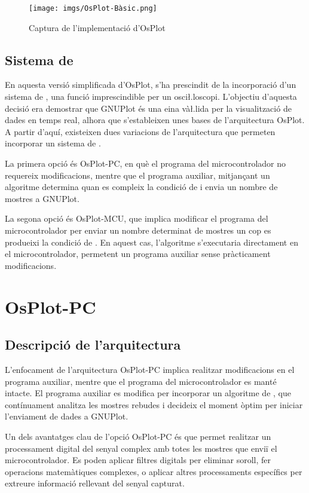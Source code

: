 \documentclass{tfgitic}[2023/07/07]
\begin{document}
\begin{figure}[h]
  \centering \texttt{[image: imgs/OsPlot-Bàsic.png]}
  \caption{Captura de l'implementació d'OsPlot}
\end{figure}

\subsection{Sistema de }

En aquesta versió simplificada d'OsPlot, s'ha prescindit de la
incorporació d'un sistema de , una funció imprescindible
per un osci\l.loscopi. L'objectiu d'aquesta decisió era demostrar que
GNUPlot és una eina và\l.lida per la visualització de dades en temps
real, alhora que s'estableixen unes bases de l'arquitectura OsPlot. A
partir d'aquí, existeixen dues variacions de l'arquitectura que
permeten incorporar un sistema de .

La primera opció és OsPlot-PC, en què el programa del microcontrolador
no requereix modificacions, mentre que el programa auxiliar,
mitjançant un algoritme determina quan es compleix la condició de
 i envia un nombre de mostres a GNUPlot.

La segona opció és OsPlot-MCU, que implica modificar el programa del
microcontrolador per enviar un nombre determinat de mostres un cop es
produeixi la condició de . En aquest cas, l'algoritme
s'executaria directament en el microcontrolador, permetent un programa
auxiliar sense pràcticament modificacions.

\section{OsPlot-PC}

\subsection{Descripció de l'arquitectura}

L'enfocament de l'arquitectura OsPlot-PC implica realitzar
modificacions en el programa auxiliar, mentre que el programa del
microcontrolador es manté intacte. El programa auxiliar es modifica
per incorporar un algoritme de , que contínuament
analitza les mostres rebudes i decideix el moment òptim per iniciar
l'enviament de dades a GNUPlot.

Un dels avantatges clau de l'opció OsPlot-PC és que permet realitzar
un processament digital del senyal complex amb totes les mostres que
enviï el microcontrolador. Es poden aplicar filtres digitals per
eliminar soroll, fer operacions matemàtiques complexes, o aplicar
altres processaments específics per extreure informació rellevant del
senyal capturat.
\end{document}
